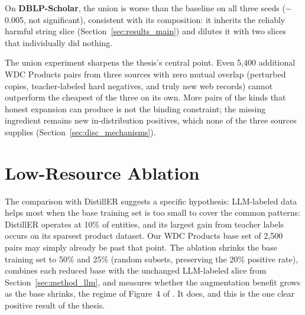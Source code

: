 \documentclass[a4paper,oneside,bibliography=totoc]{scrbook}
\begin{document}
On \textbf{DBLP-Scholar}, the union is worse than the baseline on all three seeds ($-$0.005, not significant), consistent with its composition: it inherits the reliably harmful string slice (Section~\ref{sec:results_main}) and dilutes it with two slices that individually did nothing.

The union experiment sharpens the thesis's central point. Even 5{,}400 additional WDC Products pairs from three sources with zero mutual overlap (perturbed copies, teacher-labeled hard negatives, and truly new web records) cannot outperform the cheapest of the three on its own. More pairs of the kinds that honest expansion can produce is not the binding constraint; the missing ingredient remains new in-distribution positives, which none of the three sources supplies (Section~\ref{sec:disc_mechanisms}).

\section{Low-Resource Ablation}
\label{sec:iter_lowresource}

The comparison with DistillER suggests a specific hypothesis: LLM-labeled data helps most when the base training set is too small to cover the common patterns: DistillER operates at 10\% of entities, and its largest gain from teacher labels occurs on its sparsest product dataset. Our WDC Products base set of 2{,}500 pairs may simply already be past that point. The ablation shrinks the base training set to 50\% and 25\% (random subsets, preserving the 20\% positive rate), combines each reduced base with the unchanged LLM-labeled slice from Section~\ref{sec:method_llm}, and measures whether the augmentation benefit grows as the base shrinks, the regime of Figure~4 of \citet{steiner2026labeling}. It does, and this is the one clear positive result of the thesis.
\end{document}
